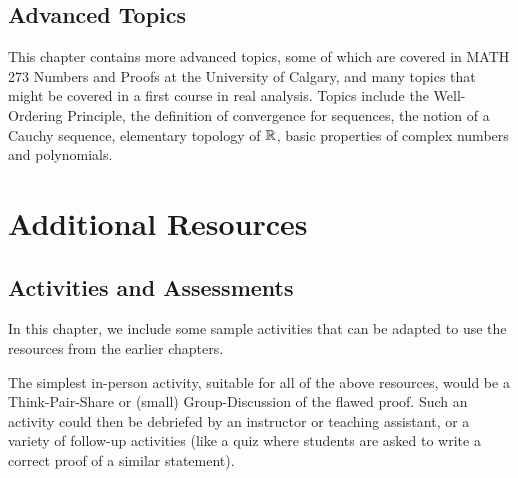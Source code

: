 \documentclass[12pt]{book}
\begin{document}
\chapter{Advanced Topics}\label{ch-adv}
This chapter contains more advanced topics, some of which are covered in MATH 273 Numbers and Proofs at the University of Calgary, and many topics that might be covered in a first course in real analysis.
Topics include the Well-Ordering Principle, the definition of convergence for sequences, the notion of a Cauchy sequence, elementary topology of $\mathbb R$, basic properties of complex numbers and polynomials.









\part{Additional Resources}\label{part-additional}
\chapter{Activities and Assessments}\label{ch-activity}
In this chapter, we include some sample activities that can be adapted to use the resources from the earlier chapters.

The simplest in-person activity, suitable for all of the above resources, would be a Think-Pair-Share or (small) Group-Discussion of the flawed proof.  Such an activity could then be debriefed by an instructor or teaching assistant, or a variety of follow-up activities (like a quiz where students are asked to write a correct proof of a similar statement).




\end{document}
